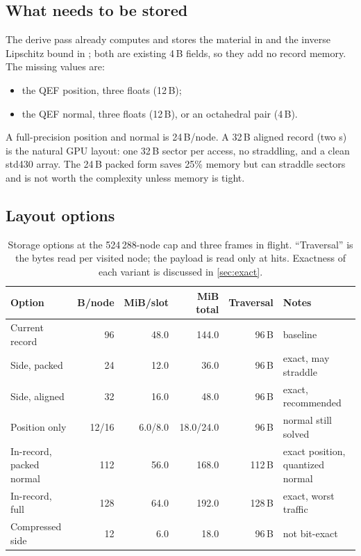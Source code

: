 \documentclass[11pt,a4paper]{article}
\newcommand{\code}[1]{\texttt{\detokenize{#1}}}
\theoremstyle{plain}
\theoremstyle{definition}
\theoremstyle{remark}
\begin{document}
\subsection{What needs to be stored}

The derive pass already computes and stores the material in \code{meta.x}
and the inverse Lipschitz bound in \code{hsv1.z}; both are existing 4\,B
fields, so they add no record memory. The missing values are:
\begin{itemize}[leftmargin=1.3em,itemsep=1pt]
\item the QEF position, three floats (12\,B);
\item the QEF normal, three floats (12\,B), or an octahedral pair (4\,B).
\end{itemize}
A full-precision position and normal is 24\,B/node. A 32\,B aligned record
(two \code{vec4}s) is the natural GPU layout: one 32\,B sector per access, no
straddling, and a clean std430 array. The 24\,B packed form saves 25\% memory
but can straddle sectors and is not worth the complexity unless memory is
tight.

\subsection{Layout options}

\begin{table}[t]
\centering
\small
\caption{Storage options at the 524\,288-node cap and three frames in flight.
``Traversal'' is the bytes read per visited node; the payload is read only at
hits. Exactness of each variant is discussed in \cref{sec:exact}.}
\label{tab:layouts}
\begin{tabularx}{\linewidth}{@{}lrrrrX@{}}
\toprule
Option & B/node & MiB/slot & MiB total & Traversal & Notes \\
\midrule
Current record & 96 & 48.0 & 144.0 & 96\,B & baseline \\
Side, packed & 24 & 12.0 & 36.0 & 96\,B & exact, may straddle \\
Side, aligned & 32 & 16.0 & 48.0 & 96\,B & exact, recommended \\
Position only & 12/16 & 6.0/8.0 & 18.0/24.0 & 96\,B & normal still solved \\
In-record, packed normal & 112 & 56.0 & 168.0 & 112\,B & exact position, quantized normal \\
In-record, full & 128 & 64.0 & 192.0 & 128\,B & exact, worst traffic \\
Compressed side & 12 & 6.0 & 18.0 & 96\,B & not bit-exact \\
\bottomrule
\end{tabularx}
\end{table}
\end{document}
